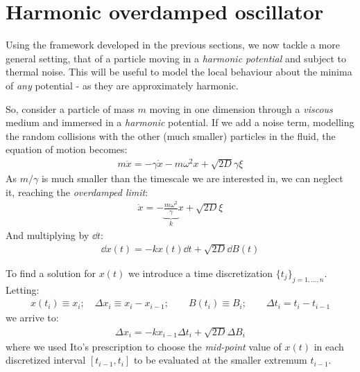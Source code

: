 \documentclass[../template.tex]{subfiles}
\begin{document}
\section{Harmonic overdamped oscillator}
Using the framework developed in the previous sections, we now tackle a more general setting, that of a particle moving in a \textit{harmonic potential} and subject to thermal noise. This will be useful to model the local behaviour about the minima of \textit{any} potential - as they are approximately harmonic.

So, consider a particle of mass $m$ moving in one dimension through a \textit{viscous} medium and immersed in a \textit{harmonic} potential. If we add a noise term, modelling the random collisions with the other (much smaller) particles in the fluid, the equation of motion becomes:
\begin{align}\label{eqn:motion-harmonic}
    m\ddot{x} = - \gamma \dot{x} - m \omega^2 x + \sqrt{2D} \gamma \xi
\end{align}
As $m/\gamma$ is much smaller than the timescale we are interested in, we can neglect it, reaching the \textit{overdamped limit}:
\begin{align*}
    \dot{x} = -\underbrace{\frac{m \omega^2}{\gamma}}_{k} x + \sqrt{2D} \xi  
\end{align*} 
And multiplying by $\dd{t}$:
\begin{align*}
    \dd{x(t)} = -kx(t) \dd{t} + \sqrt{2D} \dd{B(t)}
\end{align*}

To find a solution for $x(t)$ we introduce a time discretization $\{t_j\}_{j=1,\dots,n}$. Letting:
\begin{align*}
    x(t_i) \equiv x_i; \quad \Delta x_i \equiv x_{i} - x_{i-1}; \qquad B(t_i) \equiv B_i; \qquad \Delta t_i = t_{i} - t_{i-1}
\end{align*}
we arrive to:
\begin{align*}
    \Delta x_i = -k x_{i-1} \Delta t_i + \sqrt{2D} \Delta B_i
\end{align*}
where we used Ito's prescription to choose the \textit{mid-point} value of $x(t)$ in each discretized interval $[t_{i-1},t_i]$ to be evaluated at the smaller extremum $t_{i-1}$.
\end{document}
